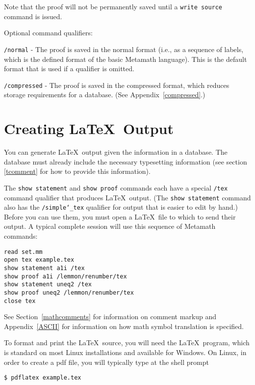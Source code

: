 Note that the proof will not be permanently saved until a \texttt{write
source} command is issued.

Optional command qualifiers:

    \texttt{/normal} - The proof is saved in the normal format (i.e., as a
        sequence of labels, which is the defined format of the basic Metamath
        language).  This is the default format that
        is used if a qualifier is omitted.

    \texttt{/compressed} - The proof is saved in the compressed format, which
        reduces storage requirements for a database.
        (See Appendix~\ref{compressed}.)


\section{Creating \LaTeX\ Output}\label{texout}

You can generate \LaTeX\ output given the
information in a database.
The database must already include the necessary typesetting information
(see section \ref{tcomment} for how to provide this information).

The \texttt{show statement} and \texttt{show proof} commands each have a
special \texttt{/tex} command qualifier that produces \LaTeX\ output.
(The \texttt{show statement} command also has the
\texttt{/simple{\char`\_}tex} qualifier for output that is easier to
edit by hand.)  Before you can use them, you must open a \LaTeX\ file to
which to send their output.  A typical complete session will use this
sequence of Metamath commands:

\begin{verbatim}
read set.mm
open tex example.tex
show statement a1i /tex
show proof a1i /lemmon/renumber/tex
show statement uneq2 /tex
show proof uneq2 /lemmon/renumber/tex
close tex
\end{verbatim}

See Section~\ref{mathcomments} for information on comment markup and
Appendix~\ref{ASCII} for information on how math symbol translation is
specified.

To format and print the \LaTeX\ source, you will need the \LaTeX\
program, which is standard on most Linux installations and available for
Windows.  On Linux, in order to create a {\sc pdf} file, you will
typically type at the shell prompt
\begin{verbatim}
$ pdflatex example.tex
\end{verbatim}

